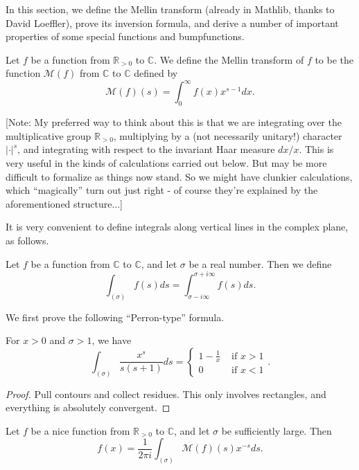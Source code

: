 
In this section, we define the Mellin transform (already in Mathlib, thanks to David Loeffler), prove its inversion formula, and
derive a number of important properties of some special functions and bumpfunctions.

\begin{definition}
Let $f$ be a function from $\mathbb{R}_{>0}$ to $\mathbb{C}$. We define the Mellin transform of $f$ to be the function $\mathcal{M}(f)$ from $\mathbb{C}$ to $\mathbb{C}$ defined by
$$\mathcal{M}(f)(s) = \int_0^\infty f(x)x^{s-1}dx.$$
\end{definition}

[Note: My preferred way to think about this is that we are integrating over the multiplicative group $\mathbb{R}_{>0}$, multiplying by a (not necessarily unitary!) character $|\cdot|^s$, and integrating with respect to the invariant Haar measure $dx/x$. This is very useful in the kinds of calculations carried out below. But may be more difficult to formalize as things now stand. So we
might have clunkier calculations, which ``magically'' turn out just right - of course they're explained by the aforementioned structure...]




It is very convenient to define integrals along vertical lines in the complex plane, as follows.
\begin{definition}\label{VerticalIntegral}
Let $f$ be a function from $\mathbb{C}$ to $\mathbb{C}$, and let $σ$ be a real number. Then we define
$$\int_{(σ)}f(s)ds = \int_{σ-i\infty}^{σ+i\infty}f(s)ds.$$
\end{definition}



We first prove the following ``Perron-type'' formula.
\begin{lemma}\label{PerronFormula}
For $x>0$ and $σ>1$, we have
$$
\int_{(σ)}\frac{x^s}{s(s+1)}ds = \begin{cases}
1-\frac1x & \text{ if }x>1\\
0 & \text{ if } x<1
\end{cases}.
$$
\end{lemma}



\begin{proof}
Pull contours and collect residues. This only involves rectangles, and everything is absolutely convergent.
\end{proof}



\begin{theorem}\label{MellinInversion}
Let $f$ be a nice function from $\mathbb{R}_{>0}$ to $\mathbb{C}$, and let $σ$ be sufficiently large. Then
$$f(x) = \frac{1}{2\pi i}\int_{(σ)}\mathcal{M}(f)(s)x^{-s}ds.$$
\end{theorem}

